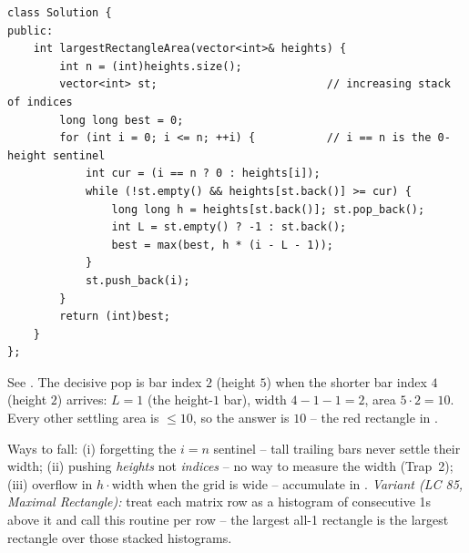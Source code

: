 \begin{lstlisting}[caption={Largest Rectangle in Histogram -- the sentinel monotonic stack (LeetCode 84)}, label={lst:c26-hist84-soln}]
class Solution {
public:
    int largestRectangleArea(vector<int>& heights) {
        int n = (int)heights.size();
        vector<int> st;                          // increasing stack of indices
        long long best = 0;
        for (int i = 0; i <= n; ++i) {           // i == n is the 0-height sentinel
            int cur = (i == n ? 0 : heights[i]);
            while (!st.empty() && heights[st.back()] >= cur) {
                long long h = heights[st.back()]; st.pop_back();
                int L = st.empty() ? -1 : st.back();
                best = max(best, h * (i - L - 1));
            }
            st.push_back(i);
        }
        return (int)best;
    }
};
\end{lstlisting}

\begin{tracebox}
See . The decisive pop is bar index $2$ (height $5$) when the shorter bar index $4$
(height $2$) arrives: $L=1$ (the height-$1$ bar), width $4-1-1=2$, area $5\cdot2=10$. Every other
settling area is $\le 10$, so the answer is $10$ -- the red rectangle in .
\end{tracebox}


\begin{warningbox}
Ways to fall: (i) forgetting the $i=n$ sentinel -- tall trailing bars never settle their width; (ii)
pushing \emph{heights} not \emph{indices} -- no way to measure the width (Trap~2); (iii) 
overflow in $h\cdot\text{width}$ when the grid is wide -- accumulate in . \emph{Variant
(LC 85, Maximal Rectangle):} treat each matrix row as a histogram of consecutive 1s above it and call
this routine per row -- the largest all-1 rectangle is the largest rectangle over those stacked
histograms.
\end{warningbox}

